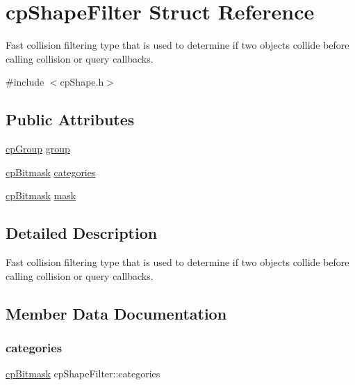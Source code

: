 \hypertarget{structcp_shape_filter}{}\section{cp\+Shape\+Filter Struct Reference}
\label{structcp_shape_filter}


Fast collision filtering type that is used to determine if two objects collide before calling collision or query callbacks.  




{\ttfamily \#include $<$cp\+Shape.\+h$>$}

\subsection*{Public Attributes}
\begin{DoxyCompactItemize}
\item 
\mbox{\hyperlink{group__basic_types_gacd811b1135a8f4a3e5cc019552b18b1a}{cp\+Group}} \mbox{\hyperlink{structcp_shape_filter_a6d29bf3cc7f406cdf834465f9de71c21}{group}}
\item 
\mbox{\hyperlink{group__basic_types_gae7ff94f62e00cae288c1991958822743}{cp\+Bitmask}} \mbox{\hyperlink{structcp_shape_filter_a916b2d61e3ea9d1e7d26a6bc59ac955b}{categories}}
\item 
\mbox{\hyperlink{group__basic_types_gae7ff94f62e00cae288c1991958822743}{cp\+Bitmask}} \mbox{\hyperlink{structcp_shape_filter_a0ee36d60cbc25e1abf18aa1508d7a537}{mask}}
\end{DoxyCompactItemize}


\subsection{Detailed Description}
Fast collision filtering type that is used to determine if two objects collide before calling collision or query callbacks. 

\subsection{Member Data Documentation}
\mbox{\label{structcp_shape_filter_a916b2d61e3ea9d1e7d26a6bc59ac955b}} 
\subsubsection{\texorpdfstring{categories}{categories}}
{\footnotesize\ttfamily \mbox{\hyperlink{group__basic_types_gae7ff94f62e00cae288c1991958822743}{cp\+Bitmask}} cp\+Shape\+Filter\+::categories}

